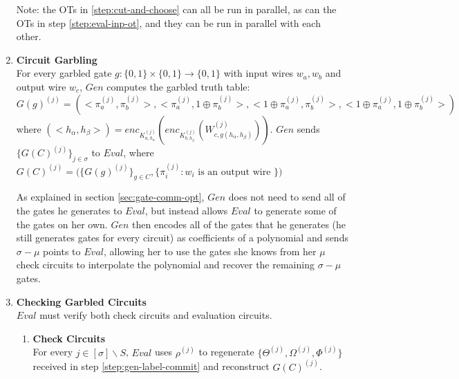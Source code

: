 \documentclass{article}
\begin{document}
\begin{enumerate}
	Note: the OTs in \ref{step:cut-and-choose} can all be run in parallel, as can the OTs in step \ref{step:eval-inp-ot}, and they can be run in parallel with each other.
	
	\item \label{step:circuit-garbling} \textbf{Circuit Garbling}\\
	For every garbled gate $g: \{0,1\} \times \{0,1\} \rightarrow \{0,1\}$ with input wires $w_{a}, w_{b}$ and output wire $w_{c}$, $Gen$ computes the garbled truth table:
	$$G(g)^{(j)} = ( <\pi_{a}^{(j)}, \pi_{b}^{(j)}>,<\pi_{a}^{(j)}, 1 \oplus \pi_{b}^{(j)}>, < 1 \oplus \pi_{a}^{(j)}, \pi_{b}^{(j)}>,<1 \oplus  \pi_{a}^{(j)}, 1 \oplus \pi_{b}^{(j)}>)$$
	where $(<h_{\alpha},h_{\beta}>) = enc_{K_{a,h_{\alpha}}^{(j)}}(   enc_{K_{b,h_{\beta}}^{(j)}} ( W_{c,g(h_{\alpha},h_{\beta})}^{(j)} ))$.
	$Gen$ sends $\{ G(C)^{(j)} \}_{j \in \sigma}$ to $Eval$, where $G(C)^{(j)} = \big( \{G(g)^{(j)}\}_{g \in C}, \{ \pi_{i}^{(j)}: w_{i} \text{ is an output wire } \}  \big)$
		
	As explained in section \ref{sec:gate-comm-opt}, $Gen$ does not need to send all of the gates he generates to $Eval$, but instead allows $Eval$ to generate some of the gates on her own. $Gen$ then encodes all of the gates that he generates (he still generates gates for every circuit) as coefficients of a polynomial and sends $\sigma - \mu$ points to $Eval$, allowing her to use the gates she knows from her $\mu$ check circuits to interpolate the polynomial and recover the remaining $\sigma - \mu$ gates. 
	
	\item \label{step:circuit-check} \textbf{Checking Garbled Circuits}\\
	$Eval$ must verify both check circuits and evaluation circuits.
	\begin{enumerate}[label=(\alph*)]
		\item \textbf{Check Circuits}\\
		For every $j \in [\sigma] \backslash S$, $Eval$ uses $\rho^{(j)}$ to regenerate $\{\Theta^{(j)}, \Omega^{(j)}, \Phi^{(j)} \}$ received in step \ref{step:gen-label-commit} and reconstruct $G(C)^{(j)}$.\\
		

\end{enumerate}
\end{enumerate}
\end{document}
